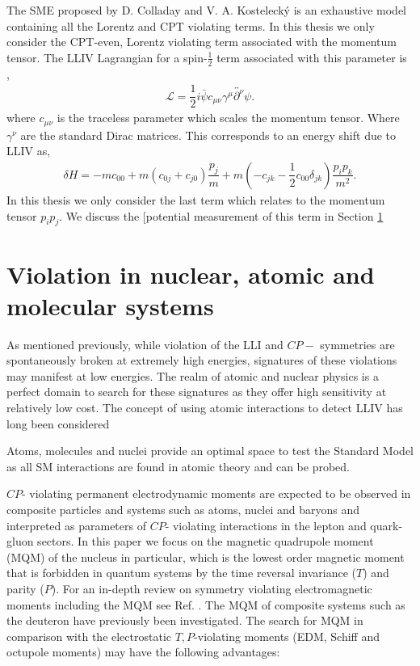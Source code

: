 \documentclass[10pt,a4paper, twoside]{report}
\begin{document}
\linebreak
The SME proposed by D. Colladay and V. A. Kosteleck\'{y} is an exhaustive model containing all the Lorentz and CPT violating terms. In this thesis we only consider the CPT-even, Lorentz violating term associated with the momentum tensor. The LLIV Lagrangian for a spin-$\tfrac{1}{2}$ term associated with this parameter is \cite{Kostelecky1999},
\begin{align}
\mathcal{L} = \dfrac{1}{2}i\bar{\psi}c_{\mu\nu}\gamma^{\mu}\overleftrightarrow{\partial^{\nu}}\psi.
\end{align} 
where $c_{\mu\nu}$ is the traceless parameter which scales the momentum tensor. Where $\gamma^{\nu}$ are the standard Dirac matrices. This corresponds to an energy shift due to LLIV as,
\begin{align}
\delta H = -mc_{00} + m\left(c_{0j} + c_{j0}\right)\dfrac{p_j}{m} + m\left(-c_{jk} - \dfrac{1}{2}c_{00}\delta_{jk}\right)\dfrac{p_ip_k}{m^2}.
\end{align} 
In this thesis we only consider the last term which relates to the momentum tensor $p_ip_j$. We discuss the [potential measurement of this term in Section \ref{sec:ViolationInAtoms}



\section{Violation in nuclear, atomic and molecular systems} \label{sec:ViolationInAtoms}
As mentioned previously, while violation of the LLI and $CP-$ symmetries are spontaneously broken at extremely high energies, signatures of these violations may manifest at low energies. The realm of atomic and nuclear physics is a perfect domain to search for these signatures as they offer high sensitivity at relatively low cost. The concept of using atomic interactions to detect LLIV has long been considered \cite{Hughes1960, Drever1961, Prestage1985, Lamoreaux1986, Lamoreaux1989}


Atoms, molecules and nuclei provide an optimal space to test the Standard Model as all SM interactions are found in atomic theory and can be probed.


$CP$- violating permanent electrodynamic moments are expected to be observed in composite particles and systems  such as atoms, nuclei and baryons and interpreted as parameters of $CP$- violating interactions in the lepton and quark-gluon sectors. In this paper we focus on the magnetic quadrupole moment (MQM) of the nucleus in particular, which is the lowest order magnetic moment that is forbidden in quantum systems by the time reversal invariance ($T$) and  parity ($P$).  For an in-depth review on symmetry violating electromagnetic moments including the MQM see Ref. \cite{GF2004, KhriplovichPNC, SFK1984, Roberts2015, KhriplovichCP, Pospelov2005}. The MQM of composite systems such as the deuteron \cite{Liu2012} have previously been investigated. The search for MQM in comparison with the electrostatic $T,P$-violating moments (EDM, Schiff and octupole moments) may have the following advantages:
\end{document}

